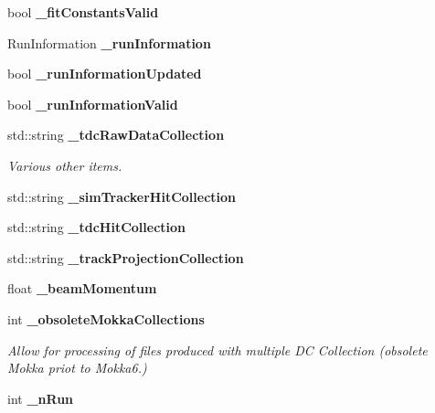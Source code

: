 \begin{DoxyCompactItemize}
\item 
bool {\bfseries \-\_\-fit\-Constants\-Valid}\label{classTBTrackBaseProcessor_a256d8f8408c677dc784b5ebc14a1113e}

\item 
Run\-Information {\bfseries \-\_\-run\-Information}\label{classTBTrackBaseProcessor_a0c503bf691e0d9de0ca661ea9f14b811}

\item 
bool {\bfseries \-\_\-run\-Information\-Updated}\label{classTBTrackBaseProcessor_a59f417ea32d96a1670591899ce531ce1}

\item 
bool {\bfseries \-\_\-run\-Information\-Valid}\label{classTBTrackBaseProcessor_afe17581672955b7dbb7ec20aa0e6a29f}

\item 
std\-::string {\bf \-\_\-tdc\-Raw\-Data\-Collection}\label{classTBTrackBaseProcessor_aa8dd92d4d8ad5abb7a00c821bbd6f0fc}

\begin{DoxyCompactList}\small\item\em Various other items. \end{DoxyCompactList}\item 
std\-::string {\bfseries \-\_\-sim\-Tracker\-Hit\-Collection}\label{classTBTrackBaseProcessor_a3087addb2e8b059f1ec6851ebf4ad8b8}

\item 
std\-::string {\bfseries \-\_\-tdc\-Hit\-Collection}\label{classTBTrackBaseProcessor_a1f1d2ecaa258f8e7b751a4b6596174af}

\item 
std\-::string {\bfseries \-\_\-track\-Projection\-Collection}\label{classTBTrackBaseProcessor_a9aa2c503f69cba5c793fadd9605e0f18}

\item 
float {\bfseries \-\_\-beam\-Momentum}\label{classTBTrackBaseProcessor_a8d2c3a429d01f14154ac44828f415c7f}

\item 
int {\bf \-\_\-obsolete\-Mokka\-Collections}\label{classTBTrackBaseProcessor_a49e71ebd14a8334e2d322e65586cec4d}

\begin{DoxyCompactList}\small\item\em Allow for processing of files produced with multiple D\-C Collection (obsolete Mokka priot to Mokka6.) \end{DoxyCompactList}\item 
int {\bfseries \-\_\-n\-Run}\label{classTBTrackBaseProcessor_ad7d0e08c632e802779a1d8b645d6c47c}


\end{DoxyCompactItemize}
